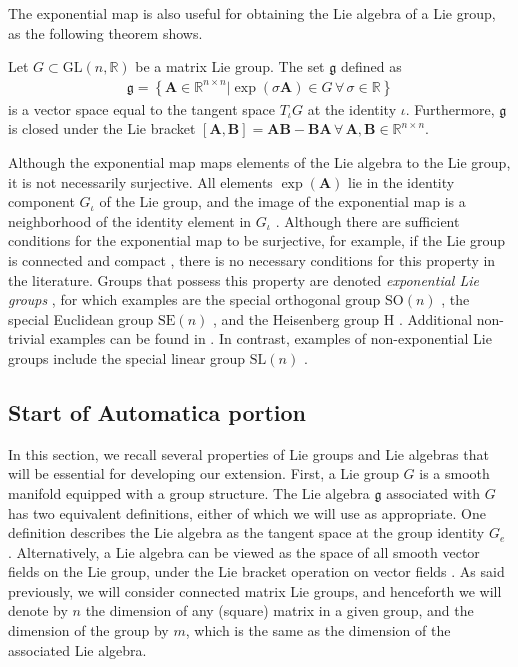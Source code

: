 The exponential map is also useful for obtaining the Lie algebra of a Lie group, as the following theorem shows.
\begin{theorem}
    Let $G\subset\text{GL}(n, \mathbb{R})$ be a matrix Lie group. The set $\mathfrak{g}$ defined as
    \begin{align}
        \mathfrak{g} = \left\{\mathbf{A}\in\mathbb{R}^{n\times n} | \exp(\sigma\mathbf{A})\in G\,\forall\,\sigma\in\mathbb{R}\right\}
    \end{align}
    is a vector space equal to the tangent space $T_\iota G$ at the identity $\iota$. Furthermore, $\mathfrak{g}$ is closed under the Lie bracket $[\mathbf{A}, \mathbf{B}] = \mathbf{A}\mathbf{B} - \mathbf{B}\mathbf{A}\,\forall\,\mathbf{A},\mathbf{B}\in\mathbb{R}^{n\times n}$.\hfill\qedsymbol
\end{theorem}

Although the exponential map maps elements of the Lie algebra to the Lie group, it is not necessarily surjective. All elements $\exp(\mathbf{A})$ lie in the identity component $G_\iota$ of the Lie group, and the image of the exponential map is a neighborhood of the identity element in $G_\iota$ \citep[p. 56]{Hall2015}. Although there are sufficient conditions for the exponential map to be surjective, for example, if the Lie group is connected and compact \citep[p. 316]{Hall2015}, there is no necessary conditions for this property in the literature. Groups that possess this property are denoted \emph{exponential Lie groups} \citep{djokovic1995exponential}, for which examples are the special orthogonal group $\text{SO}(n)$ \citep[p. 28]{Gallier2020}, the special Euclidean  group $\text{SE}(n)$ \citep[p. 42]{Gallier2020}, and the Heisenberg group $\text{H}$ \citep[p. 75]{Hall2015}. Additional non-trivial examples can be found in \citet{djokovic1995exponential}. In contrast, examples of non-exponential Lie groups include the special linear group $\text{SL}(n)$ \citep[p. 28]{Gallier2020}.

\subsection{Start of Automatica portion}
In this section, we recall several properties of Lie groups and Lie algebras that will be essential for developing our extension. First, a Lie group $G$ is a smooth manifold equipped with a group structure. The Lie algebra $\mathfrak{g}$ associated with $G$ has two equivalent definitions, either of which we will use as appropriate. One definition describes the Lie algebra as the tangent space at the group identity $G_e$ \citep[p. 16]{Gallier2020}. Alternatively, a Lie algebra can be viewed as the space of all smooth vector fields on the Lie group, under the Lie bracket operation on vector fields \citep[p. 190]{Lee2012}. As said previously, we will consider connected matrix Lie groups, and henceforth we will denote by $n$ the dimension of any (square) matrix in a given group, and the dimension of the group by $m$, which is the same as the dimension of the associated Lie algebra.

